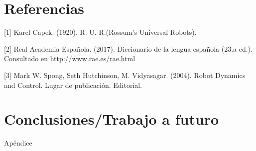 \chapter{Referencias}

[1] Karel Capek. (1920). R. U. R.(Rossum's Universal Robots).

[2] Real Academia Española. (2017). Diccionario de la lengua española (23.a ed.). Consultado en http://www.rae.es/rae.html

[3] Mark W. Spong, Seth Hutchinson, M. Vidyasagar. (2004). Robot Dynamics and Control. Lugar de publicación. Editorial.


\chapter{Conclusiones/Trabajo a futuro}

Apéndice
